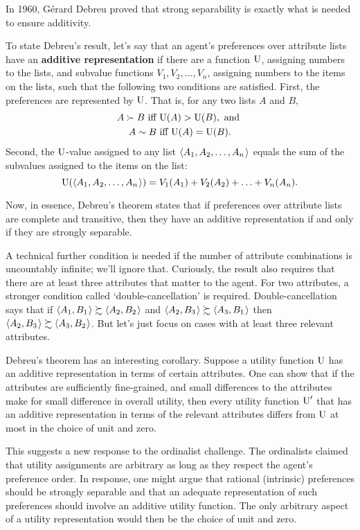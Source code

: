 In 1960, G\'erard Debreu proved that strong separability is exactly what is
needed to ensure additivity.


To state Debreu's result, let's say that an agent's preferences over attribute
lists have an \textbf{additive representation} if there are a function $\text{U}$,
assigning numbers to the lists, and subvalue functions $V_1, V_2, \ldots, V_n$,
assigning numbers to the items on the lists, such that the following two
conditions are satisfied. First, the preferences are represented by $\text{U}$. That
is, for any two lists $A$ and $B$,
\begin{gather*}
  A \succ B \text{ iff } \text{U}(A) > \text{U}(B), \text{ and }\\
  A \sim B \text{ iff }\text{U}(A) = \text{U}(B).
\end{gather*}
Second, the $\text{U}$-value assigned to any list $\t{A_1,A_2,\ldots,A_n}$ equals
the sum of the subvalues assigned to the items on the list:
\[
\U(\t{A_1,A_2,\ldots,A_n}) = V_1(A_1) + V_2(A_2) + \ldots + V_n(A_n).
\]

Now, in essence, Debreu's theorem states that if preferences over attribute
lists are complete and transitive, then they have an additive representation if
and only if they are strongly separable.

A technical further condition is needed if the number of attribute combinations
is uncountably infinite; we'll ignore that. Curiously, the result also requires
that there are at least three attributes that matter to the agent. For two
attributes, a stronger condition called `double-cancellation' is required.
Double-cancellation says that if $\t{A_1,B_1} \succsim \t{A_2,B_2}$ and
$\t{A_2,B_3} \succsim \t{A_3,B_1}$ then $\t{A_2,B_3} \succsim \t{A_3,B_2}$. But
let's just focus on cases with at least three relevant attributes.

Debreu's theorem has an interesting corollary. Suppose a utility function $\text{U}$
has an additive representation in terms of certain attributes. One can show that
if the attributes are sufficiently fine-grained, and small differences to the
attributes make for small difference in overall utility, then every utility
function $\text{U}'$ that has an additive representation in terms of the relevant
attributes differs from $\text{U}$ at most in the choice of unit and zero.

This suggests a new response to the ordinalist challenge. The ordinalists
claimed that utility assignments are arbitrary as long as they respect the
agent's preference order. In response, one might argue that rational (intrinsic)
preferences should be strongly separable and that an adequate representation of
such preferences should involve an additive utility function. The only arbitrary
aspect of a utility representation would then be the choice of unit and zero.

